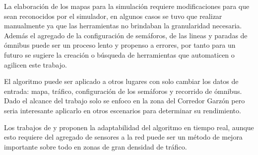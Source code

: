 La elaboración de los mapas para la simulación requiere modificaciones para que sean reconocidos por el simulador, en algunos casos se tuvo que realizar manualmente ya que las herramientas no brindaban la granularidad necesaria.
Además el agregado de la configuración de semáforos, de las lineas y paradas de ómnibus puede ser un proceso lento y propenso a errores, por tanto para un futuro se sugiere la creación o búsqueda de herramientas que automaticen o agilicen este trabajo.

El algoritmo puede ser aplicado a otros lugares con solo cambiar los datos de entrada: mapa, tráfico, configuración de los semáforos y recorrido de ómnibus. Dado el alcance del trabajo solo se enfoco en la zona del Corredor Garzón pero seria interesante aplicarlo en otros escenarios para determinar su rendimiento.

Los trabajos de  \citet{Montana1996} y \citet{Vogel2000}  proponen la adaptabilidad del algoritmo en tiempo real, aunque esto requiere del agregado de sensores a la red puede ser un método de mejora importante sobre todo en zonas de gran densidad de tráfico.
